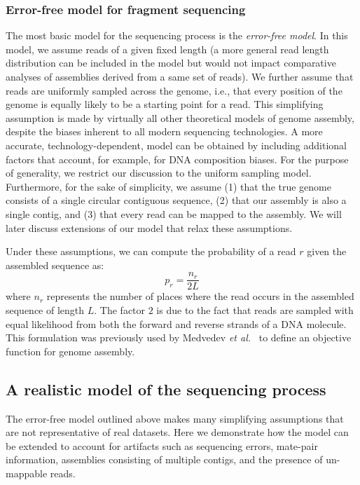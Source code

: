 \subsubsection{Error-free model for fragment sequencing}
\label{error_free_model}
The most basic model for the sequencing process is the
\emph{error-free model}. In this model, we assume reads of a given
fixed length (a more general read length distribution can be included
in the model but would not impact comparative analyses of assemblies
derived from a same set of reads). We further assume that reads are
uniformly sampled across the genome, i.e., that every position of the
genome is equally likely to be a starting point for a read. This
simplifying assumption is made by virtually all other theoretical
models of genome assembly, despite the biases inherent to all modern
sequencing technologies.  A more accurate, technology-dependent, model
can be obtained by including additional factors that account, for
example, for DNA composition biases.  For the purpose of generality,
we restrict our discussion to the uniform sampling model.
Furthermore, for the sake of simplicity, we assume (1) that the true
genome consists of a single circular contiguous sequence, (2) that our
assembly is also a single contig, and (3) that every read can be
mapped to the assembly.  We will later discuss extensions of our model
that relax these assumptions.

Under these assumptions, we can compute the probability of a
read $r$ given the assembled sequence as:
\begin{equation}
  \label{error_free_probability}
  p_r = \frac{n_r}{2L}
\end{equation}
where $n_r$ represents the number of places where the read occurs in
the assembled sequence of length $L$.  The factor $2$ is due to the
fact that reads are sampled with equal likelihood from both the
forward and reverse strands of a DNA molecule.  This formulation was
previously used by Medvedev \emph{et al.}~\cite{medvedev2009maximum}
to define an objective function for genome assembly.

\subsection{A realistic model of the sequencing process}
The error-free model outlined above makes many simplifying assumptions
that are not representative of real datasets.  Here we demonstrate
how the model can be extended to account for artifacts such as
sequencing errors, mate-pair information, assemblies consisting of
multiple contigs, and the presence of un-mappable reads.

